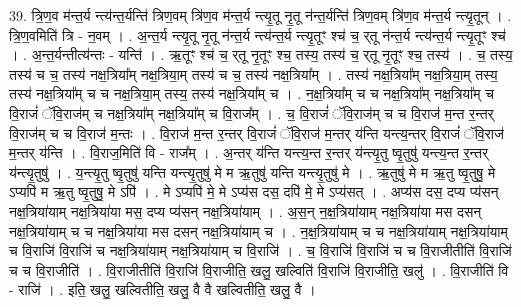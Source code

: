 \documentclass[17pt]{extarticle}
\begin{document}
39. त्रि॒ण॒व म॑न्त॒र्य न्त्य॑न्त॒र्यन्ति॑ त्रिण॒वम् त्रि॑ण॒व म॑न्त॒र्य न्त्यृ॒तू नृ॒तू न॑न्त॒र्यन्ति॑ त्रिण॒वम् त्रि॑ण॒व म॑न्त॒र्य न्त्यृ॒तून् । . त्रि॒ण॒वमिति॑ त्रि - न॒वम् । . अ॒न्त॒र्य न्त्यृ॒तू नृ॒तू न॑न्त॒र्य न्त्य॑न्त॒र्य न्त्यृ॒तूꣳ श्च॑ च॒ र्‌तू न॑न्त॒र्य न्त्य॑न्त॒र्य न्त्यृ॒तूꣳ श्च॑ । . अ॒न्त॒र्यन्तीत्य॑न्तः - यन्ति॑ । . ऋ॒तूꣳ श्च॑ च॒ र्‌तू नृ॒तूꣳ श्च॒ तस्य॒ तस्य॑ च॒ र्‌तू नृ॒तूꣳ श्च॒ तस्य॑ । . च॒ तस्य॒ तस्य॑ च च॒ तस्य॑ नक्ष॒त्रिया᳚म् नक्ष॒त्रिया॒म् तस्य॑ च च॒ तस्य॑ नक्ष॒त्रिया᳚म् । . तस्य॑ नक्ष॒त्रिया᳚म् नक्ष॒त्रिया॒म् तस्य॒ तस्य॑ नक्ष॒त्रिया᳚म् च च नक्ष॒त्रिया॒म् तस्य॒ तस्य॑ नक्ष॒त्रिया᳚म् च । . न॒क्ष॒त्रिया᳚म् च च नक्ष॒त्रिया᳚म् नक्ष॒त्रिया᳚म् च वि॒राजं॑ ॅवि॒राज॑म् च नक्ष॒त्रिया᳚म् नक्ष॒त्रिया᳚म् च वि॒राज᳚म् । . च॒ वि॒राजं॑ ॅवि॒राज॑म् च च वि॒राज॑ म॒न्त र॒न्तर् वि॒राज॑म् च च वि॒राज॑ म॒न्तः । . वि॒राज॑ म॒न्त र॒न्तर् वि॒राजं॑ ॅवि॒राज॑ म॒न्तर् य॑न्ति यन्त्य॒न्तर् वि॒राजं॑ ॅवि॒राज॑ म॒न्तर् य॑न्ति । . वि॒राज॒मिति॑ वि - राज᳚म् । . अ॒न्तर् य॑न्ति यन्त्य॒न्त र॒न्तर् य॑न्त्यृ॒तु ष्वृ॒तुषु॑ यन्त्य॒न्त र॒न्तर् य॑न्त्यृ॒तुषु॑ । . य॒न्त्यृ॒तु ष्वृ॒तुषु॑ यन्ति यन्त्यृ॒तुषु॑ मे म ऋ॒तुषु॑ यन्ति यन्त्यृ॒तुषु॑ मे । . ऋ॒तुषु॑ मे म ऋ॒तु ष्वृ॒तुषु॒ मे ऽप्यपि॑ म ऋ॒तु ष्वृ॒तुषु॒ मे ऽपि॑ । . मे ऽप्यपि॑ मे॒ मे ऽप्य॑स दस॒ दपि॑ मे॒ मे ऽप्य॑सत् । . अप्य॑स दस॒ दप्य प्य॑सन् नक्ष॒त्रिया॑याम् नक्ष॒त्रिया॑या मस॒ दप्य प्य॑सन् नक्ष॒त्रिया॑याम् । . अ॒स॒न् न॒क्ष॒त्रिया॑याम् नक्ष॒त्रिया॑या मस दसन् नक्ष॒त्रिया॑याम् च च नक्ष॒त्रिया॑या मस दसन् नक्ष॒त्रिया॑याम् च । . न॒क्ष॒त्रिया॑याम् च च नक्ष॒त्रिया॑याम् नक्ष॒त्रिया॑याम् च वि॒राजि॑ वि॒राजि॑ च नक्ष॒त्रिया॑याम् नक्ष॒त्रिया॑याम् च वि॒राजि॑ । . च॒ वि॒राजि॑ वि॒राजि॑ च च वि॒राजीतीति॑ वि॒राजि॑ च च वि॒राजीति॑ । . वि॒राजीतीति॑ वि॒राजि॑ वि॒राजीति॒ खलु॒ खल्विति॑ वि॒राजि॑ वि॒राजीति॒ खलु॑ । . वि॒राजीति॑ वि - राजि॑ । . इति॒ खलु॒ खल्वितीति॒ खलु॒ वै वै खल्वितीति॒ खलु॒ वै । \newline
\pagebreak
{}
\end{document}
